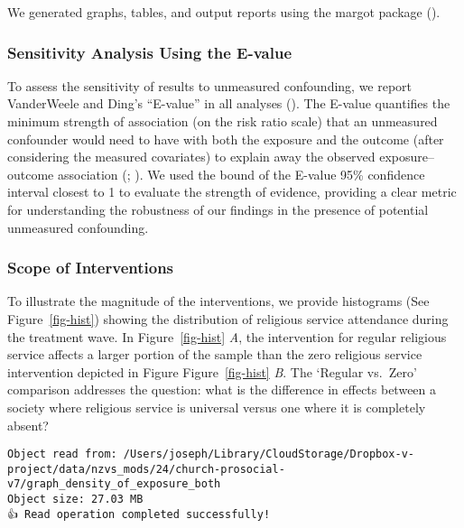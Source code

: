 \documentclass[
  single column]{article}
\begin{document}
We generated graphs, tables, and output reports using the margot package
().

\subsubsection{Sensitivity Analysis Using the
E-value}\label{sensitivity-analysis-using-the-e-value}

To assess the sensitivity of results to unmeasured confounding, we
report VanderWeele and Ding's ``E-value'' in all analyses
(). The E-value
quantifies the minimum strength of association (on the risk ratio scale)
that an unmeasured confounder would need to have with both the exposure
and the outcome (after considering the measured covariates) to explain
away the observed exposure--outcome association
(;
). We used
the bound of the E-value 95\% confidence interval closest to 1 to
evaluate the strength of evidence, providing a clear metric for
understanding the robustness of our findings in the presence of
potential unmeasured confounding.

\subsubsection{Scope of Interventions}\label{scope-of-interventions}

To illustrate the magnitude of the interventions, we provide histograms
(See Figure~\ref{fig-hist}) showing the distribution of religious
service attendance during the treatment wave. In Figure~\ref{fig-hist}
\emph{A}, the intervention for regular religious service affects a
larger portion of the sample than the zero religious service
intervention depicted in Figure Figure~\ref{fig-hist} \emph{B}. The
`Regular vs.~Zero' comparison addresses the question: what is the
difference in effects between a society where religious service is
universal versus one where it is completely absent?

\begin{verbatim}
Object read from: /Users/joseph/Library/CloudStorage/Dropbox-v-project/data/nzvs_mods/24/church-prosocial-v7/graph_density_of_exposure_both
Object size: 27.03 MB
👍 Read operation completed successfully!
\end{verbatim}
\end{document}
